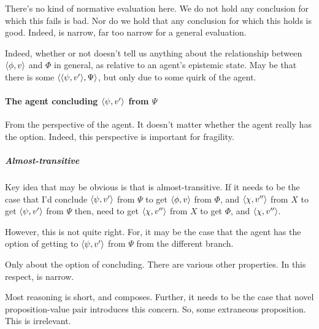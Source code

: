 \begin{note}
  There's no kind of normative evaluation here.
  We do not hold any conclusion for which this fails is bad.
  Nor do we hold that any conclusion for which this holds is good.
  Indeed, \zs{} is narrow, far too narrow for a general evaluation.

  Indeed, whether or not \zs{} doesn't tell us anything about the relationship between \(\langle \phi, v \rangle\) and \(\Phi\) in general, as relative to an agent's epistemic state.
  May be that there is some \(\langle \langle \psi, v' \rangle, \Psi \rangle\), but only due to some quirk of the agent.
\end{note}

\paragraph*{The agent concluding \(\langle \psi, v' \rangle\) from \(\Psi\)}

\begin{note}
  From the perspective of the agent.
  It doesn't matter whether the agent really has the option.
  Indeed, this perspective is important for fragility.
\end{note}

\subparagraph*{Almost-transitive}

\begin{note}
  Key idea that may be obvious is that \csN{} is almost-transitive.
  If it needs to be the case that I'd conclude \(\langle \psi, v' \rangle\) from \(\Psi\) to get \(\langle \phi, v \rangle\) from \(\Phi\), and \(\langle \chi, v'' \rangle\) from \(X\) to get \(\langle \psi, v' \rangle\) from \(\Psi\) then, need to get \(\langle \chi, v'' \rangle\) from \(X\) to get \(\Phi\), and \(\langle \chi, v'' \rangle\).

  However, this is not quite right.
  For, it may be the case that the agent has the option of getting to \(\langle \psi, v' \rangle\) from \(\Psi\) from the different branch.
\end{note}

\begin{note}
  Only about the option of concluding.
  There are various other properties.
  In this respect, \qzs{} is narrow.
\end{note}

\begin{note}
  Most reasoning is short, and composes.
  Further, it needs to be the case that novel proposition-value pair introduces this concern.
  So, some extraneous proposition.
  This is irrelevant.
\end{note}

